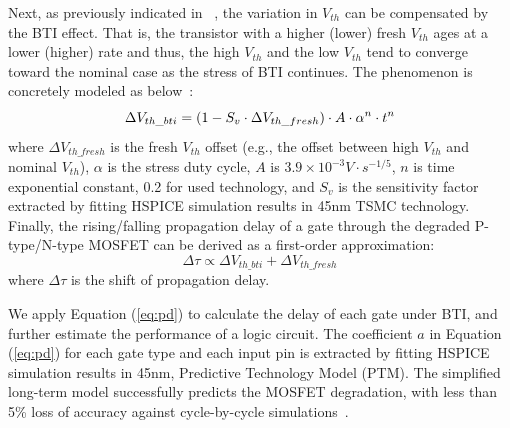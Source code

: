 Next, as previously indicated in~\cite{wang2010impact, gomez2016early} , the variation in $V_{th}$ can be compensated by the BTI effect. That is, the transistor with a higher (lower) fresh $V_{th}$ ages at a lower (higher) rate and thus, the high $V_{th}$ and the low $V_{th}$ tend to converge toward the nominal case as the stress of BTI continues. The phenomenon is concretely modeled as below~\cite{gomez2016early}:
\begin{equation}
	\centering
	\Delta V_{th\_bti} = (1 - S_{v} \cdot \Delta V_{th\_fresh})  \cdot A \cdot \alpha^n \cdot t^n
	\label{eq:cor}
\end{equation}
where $\Delta V_{th\_fresh}$ is the fresh $V_{th}$ offset (e.g., the offset between high $V_{th}$ and nominal $V_{th}$), $\alpha$ is the stress duty cycle, $A$ is $3.9 \times 10^{-3} V \cdot s^{-1/5}$, $n$ is time exponential constant, 0.2 for used technology, and $S_{v}$ is the sensitivity factor extracted by fitting HSPICE simulation results in 45nm TSMC technology.
Finally, the rising/falling propagation delay of a gate through the degraded P-type/N-type MOSFET can be derived as a first-order approximation:
\begin{equation}
	\label{eq:pd}
	\Delta \tau \propto \Delta V_{th\_bti} + \Delta V_{th\_fresh}
\end{equation}
where $\Delta \tau$ is the shift of propagation delay.

We apply Equation (\ref{eq:pd}) to calculate the delay of each gate under BTI, and further estimate the performance of a logic circuit. The coefficient $a$ in Equation (\ref{eq:pd}) for each gate type and each input pin is extracted by fitting HSPICE simulation results in 45nm, Predictive Technology Model (PTM). The simplified long-term model successfully predicts the MOSFET degradation, with less than 5\% loss of accuracy against cycle-by-cycle simulations~\cite{wang2007efficient, wang2010impact, gomez2016early, amrouch2016reliability}.

